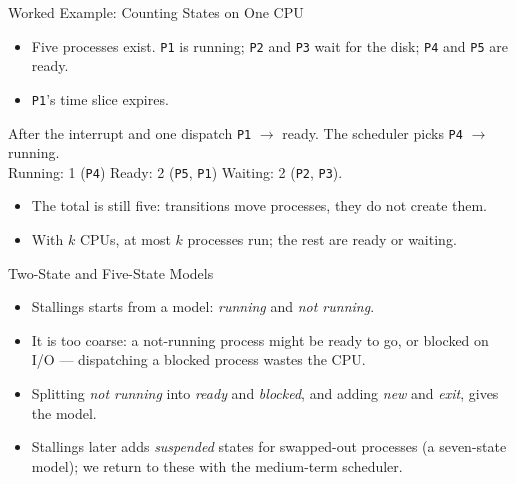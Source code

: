 \documentclass[aspectratio=169]{beamer}
\begin{document}
\begin{frame}{Worked Example: Counting States on One CPU}
  \begin{itemize}
    \item Five processes exist. \texttt{P1} is running; \texttt{P2} and
      \texttt{P3} wait for the disk; \texttt{P4} and \texttt{P5} are ready.
    \item \texttt{P1}'s time slice expires.
  \end{itemize}
  \vspace{0.15cm}
  \begin{exampleblock}{After the interrupt and one dispatch}
    \texttt{P1} $\to$ ready. The scheduler picks \texttt{P4} $\to$ running.\\
    Running: 1 (\texttt{P4}) \quad Ready: 2 (\texttt{P5}, \texttt{P1}) \quad
    Waiting: 2 (\texttt{P2}, \texttt{P3}).
  \end{exampleblock}
  \vspace{0.1cm}
  \begin{itemize}
    \item The total is still five: transitions move processes, they do not
      create them.
    \item With $k$ CPUs, at most $k$ processes run; the rest are ready or
      waiting.
  \end{itemize}
\end{frame}

\begin{frame}{Two-State and Five-State Models}
  \begin{itemize}
    \item Stallings starts from a  model: \emph{running} and
      \emph{not running}.
    \item It is too coarse: a not-running process might be ready to go, or
      blocked on I/O --- dispatching a blocked process wastes the CPU.
    \item Splitting \emph{not running} into \emph{ready} and \emph{blocked},
      and adding \emph{new} and \emph{exit}, gives the  model.
    \item Stallings later adds \emph{suspended} states for swapped-out
      processes (a seven-state model); we return to these with the
      medium-term scheduler.
  \end{itemize}
  \vspace{0.2cm}
\end{frame}
\end{document}
